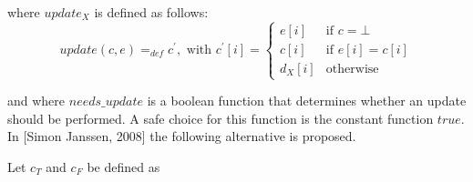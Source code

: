 \documentclass{article}
\begin{document}
where $update_{X}$ is defined as follows:%
\begin{equation*}
update(c,e)=_{def}c^{\prime },\text{ with }c^{\prime }[i]=\left\{ 
\begin{array}{ll}
e[i] & \text{if }c=\bot  \\ 
c[i] & \text{if }e[i]=c[i] \\ 
d_{X}[i] & \text{otherwise}%
\end{array}%
\right. 
\end{equation*}

and where $needs\_update$ is a boolean function that determines whether an
update should be performed. A safe choice for this function is the constant
function $true$. In [Simon Janssen, 2008] the following alternative is
proposed.

Let $c_{T}$ and $c_{F}$ be defined as
\end{document}
